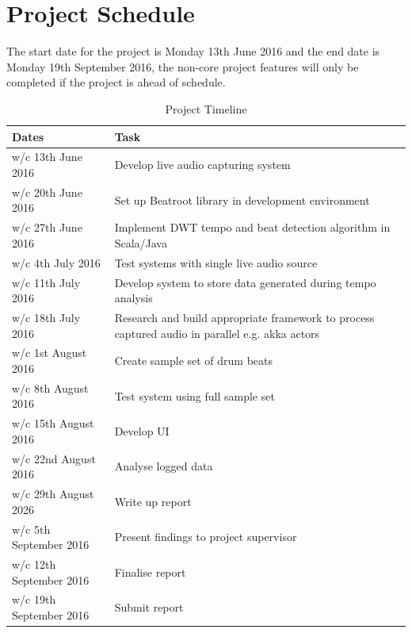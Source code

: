 \documentclass[a4paper, 11pt]{article}
\begin{document}
\clearpage
\maketitle{} 
\section {Project Schedule}
The start date for the project is Monday 13th June 2016 and the end date is Monday 19th September 2016, the non-core project features will only be completed if the project is ahead of schedule.
\begin{table}[h]
\caption{Project Timeline} 
\centering
\begin{tabular}{|p{4cm}|p{8cm}|}
 \hline
\textbf{Dates} & \textbf{Task}\\ [0.5ex]
\hline 
w/c 13th June 2016 & Develop live audio capturing system\\
\hline 
w/c 20th June 2016 & Set up Beatroot library in development environment\\
\hline 
w/c 27th June 2016 & Implement DWT tempo and beat detection algorithm in Scala/Java\\
\hline 
w/c 4th July 2016 & Test systems with single live audio source\\
\hline 
w/c 11th July 2016 & Develop system to store data generated during tempo analysis\\
\hline 
w/c 18th July 2016 & Research and build appropriate framework to process captured audio in parallel e.g. akka actors\\
\hline 
w/c 1st August 2016 & Create sample set of drum beats\\
\hline 
w/c 8th August 2016 & Test system using full sample set\\
\hline 
w/c 15th August 2016 & Develop UI\\
\hline 
w/c 22nd August 2016 & Analyse logged data\\
\hline 
w/c 29th August 2026 & Write up report\\
\hline 
w/c 5th September 2016 & Present findings to project supervisor\\
\hline 
w/c 12th September 2016 & Finalise report\\
\hline 
w/c 19th September 2016 & Submit report\\
\hline
\end{tabular}
\end{table}
\clearpage
\maketitle{} 
\end{document}
